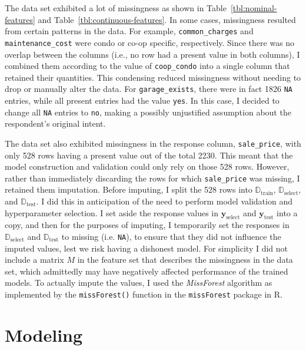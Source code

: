 \documentclass[11pt]{article}
\begin{document}
	The data set exhibited a lot of missingness as shown in Table~\ref{tbl:nominal-features}
	and Table~\ref{tbl:continuous-features}. In some cases, missingness resulted
	from certain patterns in the data. For example, \verb|common_charges|
	and \verb|maintenance_cost| were condo or co-op specific, respectively.
	Since there was no overlap between the columns (i.e., no row had a
	present value in both columns), I combined them according to the
	value of \verb|coop_condo| into a single column that retained their quantities.
	This condensing reduced missingness without needing to drop or manually
	alter the data. For \verb|garage_exists|, there were in fact 1826
	\verb|NA| entries, while all present entries had the value \verb|yes|.
	In this case, I decided to change all \verb|NA| entries to \verb|no|,
	making a possibly unjustified assumption about the respondent's original
	intent.
	
	The data set also exhibited missingness in the response column, \verb|sale_price|,
	with only 528 rows having a present value out of the total 2230. This meant that
	the model construction and validation could only rely on those 528 rows.
	However, rather than immediately discarding the rows for which \verb|sale_price|
	was missing, I retained them imputation. Before imputing, I split the 528 rows
	into $\mathbb{D}_{\text{train}}$, $\mathbb{D}_{\text{select}}$, and
	$\mathbb{D}_{\text{test}}$. I did this in anticipation of the need to perform
	model validation and hyperparameter selection. I set aside the response values
	in $\bm{y}_{\text{select}}$ and $\bm{y}_{\text{test}}$ into a copy, and then for the
	purposes of imputing, I temporarily set the responses in $\mathbb{D}_{\text{select}}$
	and $\mathbb{D}_{\text{test}}$ to missing (i.e. \verb|NA|), to ensure that they did
	not influence the imputed values, lest we risk having a dishonest model. For simplicity
	I did not include a matrix $M$ in the feature set that describes the missingness in
	the data set, which admittedly may have negatively affected performance of the
	trained models. To actually impute the values, I used the \textit{MissForest} algorithm
	as implemented by the \verb|missForest()| function in the \verb|missForest|
	package in R.
	\section{Modeling}
\end{document}
